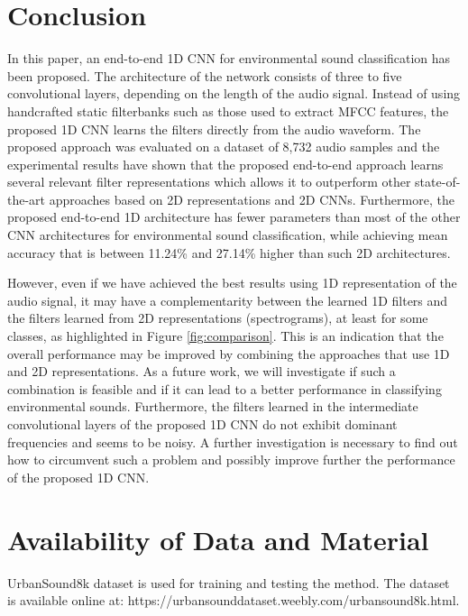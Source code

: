 \documentclass[preprint,final,12pt]{elsarticle}
\begin{document}
\section{Conclusion}
\label{sec:conc}
In this paper, an end-to-end 1D CNN for environmental sound classification has been proposed. The architecture of the network consists of three to five convolutional layers, depending on the length of the audio signal. Instead of using handcrafted static filterbanks such as those used to extract MFCC features, the proposed 1D CNN learns the filters directly from the audio waveform. The proposed approach was evaluated on a dataset of 8,732 audio samples and the experimental results have shown that the proposed end-to-end approach learns several relevant filter representations which allows it to outperform other state-of-the-art approaches based on 2D representations and 2D CNNs. Furthermore, the proposed end-to-end 1D architecture has fewer parameters than most of the other CNN architectures for environmental sound classification, while achieving mean accuracy that is between 11.24\% and 27.14\% higher than such 2D architectures.   

However, even if we have achieved the best results using 1D representation of the audio signal, it may have a complementarity between the learned 1D filters and the filters learned from 2D representations (spectrograms), at least for some classes, as highlighted in Figure \ref{fig:comparison}. This is an indication that the overall performance may be improved by combining the approaches that use 1D and 2D representations. As a future work, we will investigate if such a combination is feasible and if it can lead to a better performance in classifying environmental sounds. Furthermore, the filters learned in the intermediate convolutional layers of the proposed 1D CNN do not exhibit dominant frequencies and seems to be noisy. A further investigation is necessary to find out how to circumvent such a problem and possibly improve further the performance of the proposed 1D CNN.  



\section*{Availability of Data and Material}
UrbanSound8k dataset \citep{Salamon:2014:DTU:2647868.2655045} is used for training and testing the method. The dataset is available online at: https://urbansounddataset.weebly.com/urbansound8k.html.
\end{document}
